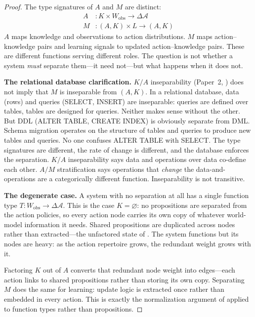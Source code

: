 \documentclass[11pt]{article}
\theoremstyle{definition}
\theoremstyle{remark}
\begin{document}
\begin{proof}
The type signatures of $A$ and $M$ are distinct:
\begin{align*}
A &: K \times W_{\mathrm{obs}} \to \Delta \mathcal{A} \\
M &: (A, K) \times L \to (A, K)
\end{align*}
$A$ maps knowledge and observations to action distributions. $M$ maps
action--knowledge pairs and learning signals to updated
action--knowledge pairs. These are different functions serving
different roles. The question is not whether a system \emph{must}
separate them---it need not---but what happens when it does not.

\textbf{The relational database clarification.}
$K/A$ inseparability (Paper~2, \cite{McCarthy2026b}) does not imply
that $M$ is inseparable from $(A, K)$. In a relational database, data
(rows) and queries (SELECT, INSERT) are inseparable: queries are
defined over tables, tables are designed for queries. Neither makes
sense without the other. But DDL (ALTER TABLE, CREATE INDEX) is
obviously separate from DML. Schema migration operates on the
structure of tables and queries to produce new tables and queries.
No one confuses ALTER TABLE with SELECT. The type signatures are
different, the rate of change is different, and the database enforces
the separation. $K/A$ inseparability says data and operations over
data co-define each other. $A/M$ stratification says operations that
\emph{change} the data-and-operations are a categorically different
function. Inseparability is not transitive.

\textbf{The degenerate case.}
A system with no separation at all has a single function type
$T : W_{\mathrm{obs}} \to \Delta\mathcal{A}$.
This is the case $K = \varnothing$: no propositions are separated
from the action policies, so every action node carries its own copy
of whatever world-model information it needs. Shared propositions
are duplicated across nodes rather than extracted---the unfactored
state of \cite{McCarthy2026a}. The system functions but its nodes
are heavy: as the action repertoire grows, the redundant weight
grows with it.

Factoring $K$ out of $A$ converts that redundant node weight into
edges---each action links to shared propositions rather than
storing its own copy. Separating $M$ does the same for learning:
update logic is extracted once rather than embedded in every action.
This is exactly the normalization argument of \cite{McCarthy2026b}
applied to function types rather than propositions.


\end{proof}
\end{document}
